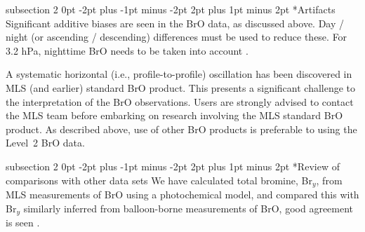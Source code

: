 \documentclass[11pt,draft]{report}
\makeatletter
\renewcommand{\subsection}{\@startsection%
  {subsection}%
  {2}%
  {0pt}%
  {-2pt plus -1pt minus -2pt}%
  {2pt plus 1pt minus 2pt}%
  {\large\sffamily\fontseries{sb}\selectfont\flushleft\color{SectionColor}\figureversion{tabular}}}%
\makeatother
\begin{document}
\subsection*{Artifacts}
Significant additive biases are seen in the BrO data, as discussed
above. Day / night (or ascending / descending) differences must be used to
reduce these.  For 3.2 hPa, nighttime BrO needs to be taken into
account \citep{KovalenkoEtal07}.

A systematic horizontal (i.e., profile-to-profile) oscillation has been
discovered in MLS \thisv (and earlier) standard BrO product.  This
presents a significant challenge to the interpretation of the BrO
observations.  Users are strongly advised to contact the MLS team before
embarking on research involving the MLS standard BrO product.  As
described above, use of other BrO products is preferable to using the
Level~2 BrO data.

\subsection*{Review of comparisons with other data sets}
We have calculated total bromine, Br$_{y}$, from MLS measurements of BrO
using a photochemical model, and compared this with Br$_{y}$ similarly
inferred from balloon-borne measurements of BrO, good agreement is seen
\citep{KovalenkoEtal07}.
\end{document}

